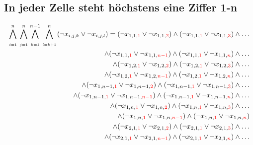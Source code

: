 \documentclass[11pt, a4paper]{article}
\begin{document}
	\subsection{In jeder Zelle steht höchstens eine Ziffer 1-n}
	\begin{align*}
	\bigwedge_{\atop i=1}^n \bigwedge_{\atop j=1}^n \bigwedge_{\atop k=1}^{n-1} \bigwedge_{\atop l=k+1}^n
	(\neg x_{i,j,k} \vee \neg x_{i,j,l}) = 
	(\neg x_{1,1,{\color{red} 1}} \vee \neg x_{1,1,{\color{red} 2}}) 
	\wedge 
	(\neg x_{1,1,{\color{red} 1}} \vee \neg x_{1,1,{\color{red} 3}})
	\wedge \dots \\
	\wedge
	(\neg x_{1,1,{\color{red} 1}} \vee \neg x_{1,1,{\color{red} n-1}})
	\wedge
	(\neg x_{1,1,{\color{red} 1}} \vee \neg x_{1,1,{\color{red} n}})
	\wedge \dots \\
	\wedge
	(\neg x_{1,2,{\color{red} 1}} \vee \neg x_{1,2,{\color{red} 2}}) 
	\wedge 
	(\neg x_{1,2,{\color{red} 1}} \vee \neg x_{1,2,{\color{red} 3}})
	\wedge \dots \\
	\wedge
	(\neg x_{1,2,{\color{red} 1}} \vee \neg x_{1,2,{\color{red} n-1}})
	\wedge
	(\neg x_{1,2,{\color{red} 1}} \vee \neg x_{1,2,{\color{red} n}})
	\wedge \dots \\
	\wedge
	(\neg x_{1,n-1,{\color{red} 1}} \vee \neg x_{1,n-1,{\color{red} 2}}) 
	\wedge 
	(\neg x_{1,n-1,{\color{red} 1}} \vee \neg x_{1,n-1,{\color{red} 3}})
	\wedge \dots \\
	\wedge
	(\neg x_{1,n-1,{\color{red} 1}} \vee \neg x_{1,n-1,{\color{red} n-1}})
	\wedge
	(\neg x_{1,n-1,{\color{red} 1}} \vee \neg x_{1,n-1,{\color{red} n}})
	\wedge \dots \\
	\wedge
	(\neg x_{1,n,{\color{red} 1}} \vee \neg x_{1,n,{\color{red} 2}}) 
	\wedge 
	(\neg x_{1,n,{\color{red} 1}} \vee \neg x_{1,n,{\color{red} 3}})
	\wedge \dots \\
	\wedge
	(\neg x_{1,n,{\color{red} 1}} \vee \neg x_{1,n,{\color{red} n-1}})
	\wedge
	(\neg x_{1,n,{\color{red} 1}} \vee \neg x_{1,n,{\color{red} n}})
	\\
	\wedge (\neg x_{2,1,{\color{red} 1}} \vee \neg x_{2,1,{\color{red} 2}}) 
	\wedge 
	(\neg x_{2,1,{\color{red} 1}} \vee \neg x_{2,1,{\color{red} 3}})
	\wedge \dots \\
	\wedge
	(\neg x_{2,1,{\color{red} 1}} \vee \neg x_{2,1,{\color{red} n-1}})
	\wedge
	(\neg x_{2,1,{\color{red} 1}} \vee \neg x_{2,1,{\color{red} n}})
	\wedge \dots \\

\end{align*}
\end{document}
